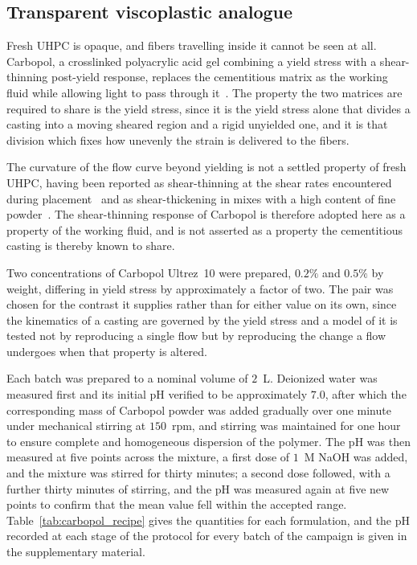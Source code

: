 \documentclass[%
  aip,
  pof,          %
  reprint,      %
  floatfix
]{revtex4-2}
\begin{document}
\subsection{Transparent viscoplastic analogue}
\label{sec:analogue}

Fresh UHPC is opaque, and fibers travelling inside it cannot be seen at all. Carbopol, a crosslinked polyacrylic acid gel combining a yield stress with a shear-thinning post-yield response, replaces the cementitious matrix as the working fluid while allowing light to pass through it~\cite{auernhammer2020transparent,piau2007carbopol}. The property the two matrices are required to share is the yield stress, since it is the yield stress alone that divides a casting into a moving sheared region and a rigid unyielded one, and it is that division which fixes how unevenly the strain is delivered to the fibers.

The curvature of the flow curve beyond yielding is not a settled property of fresh UHPC, having been reported as shear-thinning at the shear rates encountered during placement~\cite{delarrard1998fresh} and as shear-thickening in mixes with a high content of fine powder~\cite{feys2009shear}. The shear-thinning response of Carbopol is therefore adopted here as a property of the working fluid, and is not asserted as a property the cementitious casting is thereby known to share.

Two concentrations of Carbopol Ultrez~10 were prepared, $0.2\%$ and $0.5\%$ by weight, differing in yield stress by approximately a factor of two. The pair was chosen for the contrast it supplies rather than for either value on its own, since the kinematics of a casting are governed by the yield stress and a model of it is tested not by reproducing a single flow but by reproducing the change a flow undergoes when that property is altered.

Each batch was prepared to a nominal volume of $2$~L. Deionized water was measured first and its initial pH verified to be approximately $7.0$, after which the corresponding mass of Carbopol powder was added gradually over one minute under mechanical stirring at $150$~rpm, and stirring was maintained for one hour to ensure complete and homogeneous dispersion of the polymer. The pH was then measured at five points across the mixture, a first dose of $1$~M NaOH was added, and the mixture was stirred for thirty minutes; a second dose followed, with a further thirty minutes of stirring, and the pH was measured again at five new points to confirm that the mean value fell within the accepted range. Table~\ref{tab:carbopol_recipe} gives the quantities for each formulation, and the pH recorded at each stage of the protocol for every batch of the campaign is given in the supplementary material.
\end{document}
